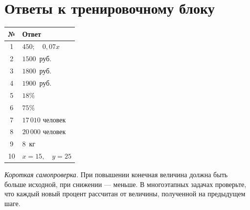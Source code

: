 \documentclass[a4paper,12pt]{article}
\newcommand{\answer}[2]{#1 & #2 \\}
\begin{document}
\section*{Ответы к тренировочному блоку}
\begin{center}
\renewcommand{\arraystretch}{1.5}
\begin{tabularx}{.92\linewidth}{@{}cX@{}}
\toprule
\textbf{№} & \textbf{Ответ}\\
\midrule
\answer{1}{\(450;\quad 0{,}07x\)}
\answer{2}{\(1500\)~руб.}
\answer{3}{\(1800\)~руб.}
\answer{4}{\(1900\)~руб.}
\answer{5}{\(18\%\)}
\answer{6}{\(75\%\)}
\answer{7}{\(17\,010\) человек}
\answer{8}{\(20\,000\) человек}
\answer{9}{\(8\)~кг}
\answer{10}{\(x=15,\quad y=25\)}
\bottomrule
\end{tabularx}
\end{center}
\vspace{9mm}
\textit{Короткая самопроверка.} При повышении конечная величина должна быть больше исходной, при снижении --- меньше. В многоэтапных задачах проверьте, что каждый новый процент рассчитан от величины, полученной на предыдущем шаге.
\end{document}
